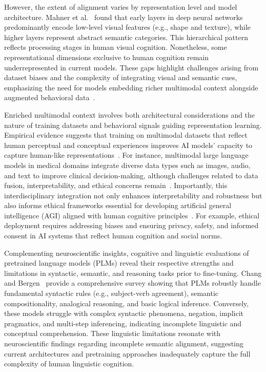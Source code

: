 \documentclass[sigconf]{acmart}
\begin{document}
However, the extent of alignment varies by representation level and model architecture. Mahner et al.~\cite{ref2} found that early layers in deep neural networks predominantly encode low-level visual features (e.g., shape and texture), while higher layers represent abstract semantic categories. This hierarchical pattern reflects processing stages in human visual cognition. Nonetheless, some representational dimensions exclusive to human cognition remain underrepresented in current models. These gaps highlight challenges arising from dataset biases and the complexity of integrating visual and semantic cues, emphasizing the need for models embedding richer multimodal context alongside augmented behavioral data~\cite{ref2,ref4,ref5}.

Enriched multimodal context involves both architectural considerations and the nature of training datasets and behavioral signals guiding representation learning. Empirical evidence suggests that training on multimodal datasets that reflect human perceptual and conceptual experiences improves AI models’ capacity to capture human-like representations~\cite{ref4,ref5}. For instance, multimodal large language models in medical domains integrate diverse data types such as images, audio, and text to improve clinical decision-making, although challenges related to data fusion, interpretability, and ethical concerns remain~\cite{ref4,ref5}. Importantly, this interdisciplinary integration not only enhances interpretability and robustness but also informs ethical frameworks essential for developing artificial general intelligence (AGI) aligned with human cognitive principles~\cite{ref2,ref4,ref5}. For example, ethical deployment requires addressing biases and ensuring privacy, safety, and informed consent in AI systems that reflect human cognition and social norms.

Complementing neuroscientific insights, cognitive and linguistic evaluations of pretrained language models (PLMs) reveal their respective strengths and limitations in syntactic, semantic, and reasoning tasks prior to fine-tuning. Chang and Bergen~\cite{ref34} provide a comprehensive survey showing that PLMs robustly handle fundamental syntactic rules (e.g., subject-verb agreement), semantic compositionality, analogical reasoning, and basic logical inference. Conversely, these models struggle with complex syntactic phenomena, negation, implicit pragmatics, and multi-step inferencing, indicating incomplete linguistic and conceptual comprehension. These linguistic limitations resonate with neuroscientific findings regarding incomplete semantic alignment, suggesting current architectures and pretraining approaches inadequately capture the full complexity of human linguistic cognition.
\end{document}
